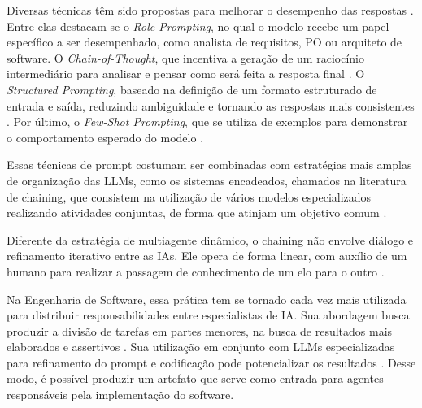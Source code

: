 Diversas técnicas têm sido propostas para melhorar o desempenho das respostas \cite{nacimento2024exploraccao}. Entre elas destacam-se o \textit{Role Prompting}, no qual o modelo recebe um papel específico a ser desempenhado, como analista de requisitos, PO ou arquiteto de software. O \textit{Chain-of-Thought}, que incentiva a geração de um raciocínio intermediário para analisar e pensar como será feita a resposta final \cite{minaee_large_2024}. O \textit{Structured Prompting}, baseado na definição de um formato estruturado de entrada e saída, reduzindo ambiguidade e tornando as respostas mais consistentes \cite{ciudrowski2026explorando}. Por último, o \textit{Few-Shot Prompting}, que se utiliza de exemplos para demonstrar o comportamento esperado do modelo \cite{minaee_large_2024}.

Essas técnicas de prompt costumam ser combinadas com estratégias mais amplas de organização das LLMs, como os sistemas encadeados, chamados na literatura de chaining, que consistem na utilização de vários modelos especializados realizando atividades conjuntas, de forma que atinjam um objetivo comum \cite{minaee_large_2024}.

Diferente da estratégia de multiagente dinâmico, o chaining não envolve diálogo e refinamento iterativo entre as IAs. Ele opera de forma linear, com auxílio de um humano para realizar a passagem de conhecimento de um elo para o outro \cite{minaee_large_2024}.

Na Engenharia de Software, essa prática tem se tornado cada vez mais utilizada para distribuir responsabilidades entre especialistas de IA. Sua abordagem busca produzir a divisão de tarefas em partes menores, na busca de resultados mais elaborados e assertivos \cite{larguesa2025engenharia}. Sua utilização em conjunto com LLMs especializadas para refinamento do prompt e codificação pode potencializar os resultados \cite{ribeiro_software_2025}. Desse modo, é possível produzir um artefato que serve como entrada para agentes responsáveis pela implementação do software.
